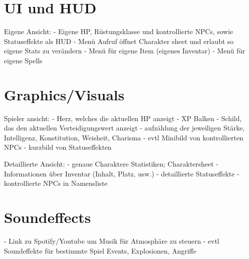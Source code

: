 \documentclass[11pt]{article}
\begin{document}
    \section{UI und HUD}\label{sec:ui-und-hud}
    Eigene Ansicht:
    - Eigene HP, Rüstungsklasse und kontrollierte NPCs, sowie Statuseffekte als HUD
    - Menü Aufruf öffnet Charakter sheet und erlaubt so eigene Stats zu verändern
    - Menü für eigene Item (eigenes Inventar)
    - Menü für eigene Spells

    \section{Graphics/Visuals}\label{sec:graphics/visuals}
    Spieler ansicht:
    - Herz, welches die aktuellen HP anzeigt
    - XP Balken
    - Schild, das den aktuellen Verteidigungswert anzeigt
    - aufzählung der jeweiligen Stärke, Intelligenz, Konstitution, Weisheit, Charisma
    - evtl Minibild von kontrollierten NPCs
    - kurzbild von Statuseffekten

    Detaillierte Ansicht:
    - genaue Charaktere Statistiken; Charaktersheet
    - Informationen über Inventar (Inhalt, Platz, usw.)
    - detaillierte Statuseffekte
    - kontrollierte NPCs in Namensliste

    \section{Soundeffects}\label{sec:soundeffects}
    - Link zu Spotify/Youtube um Musik für Atmosphäre zu steuern
    - evtl Soundeffekte für bestimmte Spiel Events, Explosionen, Angriffe
\end{document}
